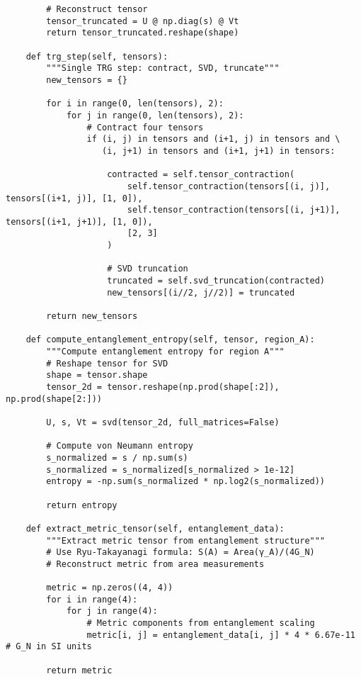 \documentclass[11pt]{article}
\theoremstyle{definition}
\begin{document}
\begin{verbatim}
        # Reconstruct tensor
        tensor_truncated = U @ np.diag(s) @ Vt
        return tensor_truncated.reshape(shape)
    
    def trg_step(self, tensors):
        """Single TRG step: contract, SVD, truncate"""
        new_tensors = {}
        
        for i in range(0, len(tensors), 2):
            for j in range(0, len(tensors), 2):
                # Contract four tensors
                if (i, j) in tensors and (i+1, j) in tensors and \
                   (i, j+1) in tensors and (i+1, j+1) in tensors:
                    
                    contracted = self.tensor_contraction(
                        self.tensor_contraction(tensors[(i, j)], tensors[(i+1, j)], [1, 0]),
                        self.tensor_contraction(tensors[(i, j+1)], tensors[(i+1, j+1)], [1, 0]),
                        [2, 3]
                    )
                    
                    # SVD truncation
                    truncated = self.svd_truncation(contracted)
                    new_tensors[(i//2, j//2)] = truncated
        
        return new_tensors
    
    def compute_entanglement_entropy(self, tensor, region_A):
        """Compute entanglement entropy for region A"""
        # Reshape tensor for SVD
        shape = tensor.shape
        tensor_2d = tensor.reshape(np.prod(shape[:2]), np.prod(shape[2:]))
        
        U, s, Vt = svd(tensor_2d, full_matrices=False)
        
        # Compute von Neumann entropy
        s_normalized = s / np.sum(s)
        s_normalized = s_normalized[s_normalized > 1e-12]
        entropy = -np.sum(s_normalized * np.log2(s_normalized))
        
        return entropy
    
    def extract_metric_tensor(self, entanglement_data):
        """Extract metric tensor from entanglement structure"""
        # Use Ryu-Takayanagi formula: S(A) = Area(γ_A)/(4G_N)
        # Reconstruct metric from area measurements
        
        metric = np.zeros((4, 4))
        for i in range(4):
            for j in range(4):
                # Metric components from entanglement scaling
                metric[i, j] = entanglement_data[i, j] * 4 * 6.67e-11  # G_N in SI units
        
        return metric
    

\end{verbatim}
\end{document}

